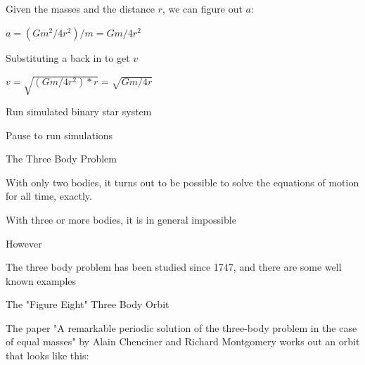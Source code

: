 \documentclass[bigger]{beamer}
\begin{document}
\begin{frame}[label=sec-36]{Given the masses and the distance $r$, we can figure out $a$:}
\begin{center}
{\LARGE $ a = (Gm^2/4r^2)/m = Gm/4r^2 $}
\end{center}
\end{frame}
\begin{frame}[label=sec-37]{Substituting a back in to get $v$}
\begin{center}
{\LARGE $v = \sqrt{(Gm/4r^2)*r} = \sqrt{Gm/4r} $ }
\end{center}
\end{frame}
\begin{frame}[label=sec-38]{Run simulated binary star system}
\begin{block}{Pause to run simulations}
\end{block}
\end{frame}
\begin{frame}[label=sec-39]{The Three Body Problem}
\begin{block}{With only two bodies, it turns out to be possible to solve the equations of motion for \alert{all time}, exactly.}
\end{block}
\begin{block}{With three or more bodies, it is in general impossible}
\end{block}
\end{frame}
\begin{frame}[label=sec-40]{However}
\begin{block}{The three body problem has been studied since 1747, and there are some well known examples}
\end{block}
\end{frame}
\begin{frame}[label=sec-41]{The "Figure Eight" Three Body Orbit}
\begin{block}{The paper "A remarkable periodic solution of the three-body problem in the case of equal masses" by Alain Chenciner and Richard Montgomery works out an orbit that looks like this:}
\begin{center}
\end{center}
\end{block}
\end{frame}
\end{document}
